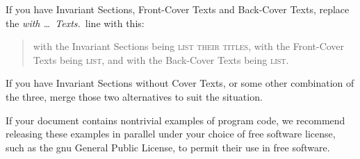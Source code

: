 If you have Invariant Sections, Front-Cover Texts and Back-Cover Texts,
replace the \emph{with \dots\ Texts.}\ line with this:

\bigskip
\begin{quote}
  with the Invariant Sections being \textsc{list their titles}, with
  the Front-Cover Texts being \textsc{list}, and with the Back-Cover
  Texts being \textsc{list}.
\end{quote}
\bigskip
    
If you have Invariant Sections without Cover Texts, or some other
combination of the three, merge those two alternatives to suit the
situation.

If your document contains nontrivial examples of program code, we
recommend releasing these examples in parallel under your choice of
free software license, such as the \gls{gnu} General Public License,
to permit their use in free software.


